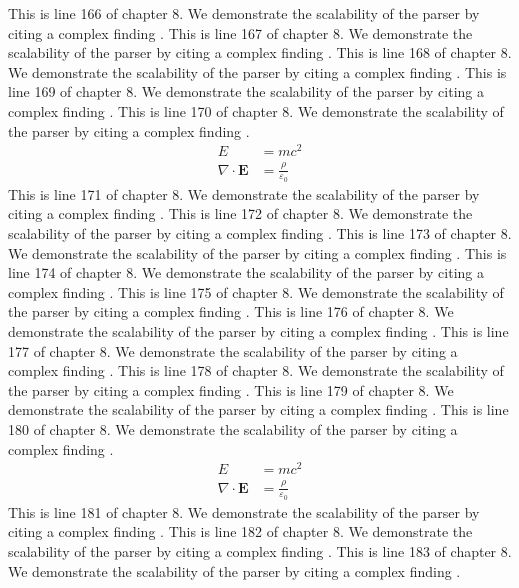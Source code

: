 This is line 166 of chapter 8. We demonstrate the scalability of the parser by citing a complex finding \cite{ref8_166}.
This is line 167 of chapter 8. We demonstrate the scalability of the parser by citing a complex finding \cite{ref8_167}.
This is line 168 of chapter 8. We demonstrate the scalability of the parser by citing a complex finding \cite{ref8_168}.
This is line 169 of chapter 8. We demonstrate the scalability of the parser by citing a complex finding \cite{ref8_169}.
This is line 170 of chapter 8. We demonstrate the scalability of the parser by citing a complex finding \cite{ref8_170}.
\begin{align*}
  E &= mc^2 \\
  \nabla \cdot \mathbf{E} &= \frac{\rho}{\varepsilon_0}
\end{align*}
This is line 171 of chapter 8. We demonstrate the scalability of the parser by citing a complex finding \cite{ref8_171}.
This is line 172 of chapter 8. We demonstrate the scalability of the parser by citing a complex finding \cite{ref8_172}.
This is line 173 of chapter 8. We demonstrate the scalability of the parser by citing a complex finding \cite{ref8_173}.
This is line 174 of chapter 8. We demonstrate the scalability of the parser by citing a complex finding \cite{ref8_174}.
This is line 175 of chapter 8. We demonstrate the scalability of the parser by citing a complex finding \cite{ref8_175}.
This is line 176 of chapter 8. We demonstrate the scalability of the parser by citing a complex finding \cite{ref8_176}.
This is line 177 of chapter 8. We demonstrate the scalability of the parser by citing a complex finding \cite{ref8_177}.
This is line 178 of chapter 8. We demonstrate the scalability of the parser by citing a complex finding \cite{ref8_178}.
This is line 179 of chapter 8. We demonstrate the scalability of the parser by citing a complex finding \cite{ref8_179}.
This is line 180 of chapter 8. We demonstrate the scalability of the parser by citing a complex finding \cite{ref8_180}.
\begin{align*}
  E &= mc^2 \\
  \nabla \cdot \mathbf{E} &= \frac{\rho}{\varepsilon_0}
\end{align*}
This is line 181 of chapter 8. We demonstrate the scalability of the parser by citing a complex finding \cite{ref8_181}.
This is line 182 of chapter 8. We demonstrate the scalability of the parser by citing a complex finding \cite{ref8_182}.
This is line 183 of chapter 8. We demonstrate the scalability of the parser by citing a complex finding \cite{ref8_183}.
